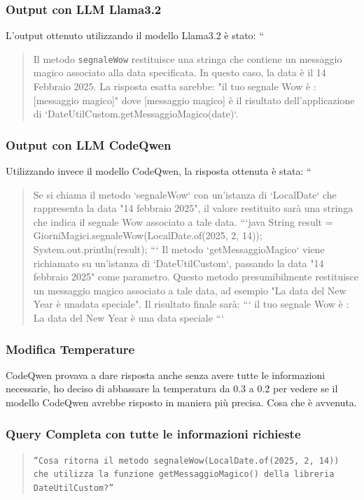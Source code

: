 \documentclass[12pt,a4paper,openright,twoside]{book}
\begin{document}
\subsubsection{Output con LLM Llama3.2}
L'output ottenuto utilizzando il modello Llama3.2 è stato:
``
\begin{quote}
Il metodo \texttt{segnaleWow} restituisce una stringa che contiene un messaggio magico associato alla data specificata. In questo caso, la data è il 14 Febbraio 2025.
La risposta esatta sarebbe:
"il tuo segnale Wow è : [messaggio magico]"
dove [messaggio magico] è il risultato dell'applicazione di `DateUtilCustom.getMessaggioMagico(date)`.
\end{quote}

\subsubsection{Output con LLM CodeQwen}
Utilizzando invece il modello CodeQwen, la risposta ottenuta è stata:
``
\begin{quote}
    Se si chiama il metodo `segnaleWow` con un'istanza di `LocalDate` che rappresenta la data "14 febbraio 2025", il valore restituito sarà una stringa che indica il segnale Wow associato a tale data.
    ```java
    String result = GiorniMagici.segnaleWow(LocalDate.of(2025, 2, 14));
    System.out.println(result);
    ```
    Il metodo `getMessaggioMagico` viene richiamato su un'istanza di `DateUtilCustom`, passando la data "14 febbraio 2025" come parametro. Questo metodo presumibilmente restituisce un messaggio magico associato a tale data, ad esempio "La data del New Year è unadata speciale".
    Il risultato finale sarà:
    ```
    il tuo segnale Wow è : La data del New Year è una data speciale
    ```
\end{quote}

\subsubsection{Modifica Temperature}
CodeQwen provava a dare risposta anche senza avere tutte le informazioni necessarie, ho deciso di abbassare la temperatura da 0.3 a 0.2 per vedere se il modello CodeQwen avrebbe risposto in maniera più precisa.
Cosa che è avvenuta.

\subsubsection{Query Completa con tutte le informazioni richieste}
\begin{quote}
    \texttt{``Cosa ritorna il metodo segnaleWow(LocalDate.of(2025, 2, 14)) che utilizza la funzione getMessaggioMagico() della libreria DateUtilCustom?''}
\end{quote}
\end{document}
